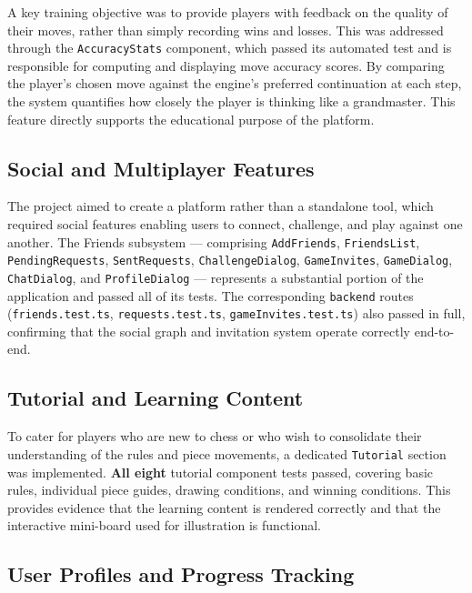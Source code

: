 A key training objective was to provide players with feedback on the quality of their moves, rather than simply recording wins and losses. This was addressed through the \texttt{AccuracyStats} component, which passed its automated test and is responsible for computing and displaying move accuracy scores. By comparing the player's chosen move against the engine's preferred continuation at each step, the system quantifies how closely the player is thinking like a grandmaster. This feature directly supports the educational purpose of the platform.

\subsection*{Social and Multiplayer Features}

The project aimed to create a platform rather than a standalone tool, which required social features enabling users to connect, challenge, and play against one another. The Friends subsystem — comprising \texttt{AddFriends}, \texttt{FriendsList}, \texttt{PendingRequests}, \texttt{SentRequests}, \texttt{ChallengeDialog}, \texttt{GameInvites}, \texttt{GameDialog}, \texttt{ChatDialog}, and \texttt{ProfileDialog} — represents a substantial portion of the application and passed all of its tests. The corresponding \texttt{backend} routes (\texttt{friends.test.ts}, \texttt{requests.test.ts}, \texttt{gameInvites.test.ts}) also passed in full, confirming that the social graph and invitation system operate correctly end-to-end.

\subsection*{Tutorial and Learning Content}

To cater for players who are new to chess or who wish to consolidate their understanding of the rules and piece movements, a dedicated \texttt{Tutorial} section was implemented. \textbf{All eight} tutorial component tests passed, covering basic rules, individual piece guides, drawing conditions, and winning conditions. This provides evidence that the learning content is rendered correctly and that the interactive mini-board used for illustration is functional.

\subsection*{User Profiles and Progress Tracking}

